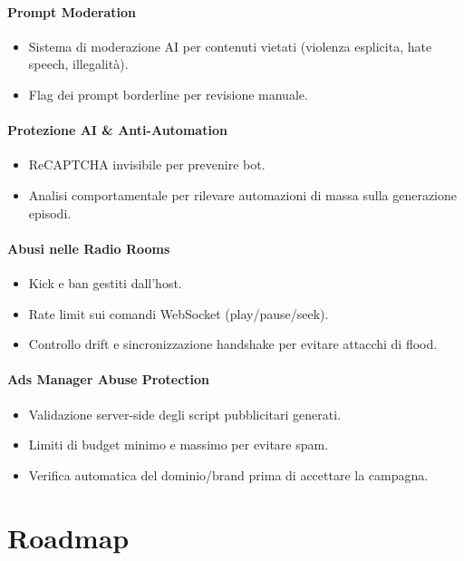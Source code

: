 \documentclass[11pt,a4paper]{article}
\begin{document}
\paragraph{Prompt Moderation}
\begin{itemize}
    \item Sistema di moderazione AI per contenuti vietati (violenza esplicita, hate speech, illegalità).
    \item Flag dei prompt borderline per revisione manuale.
\end{itemize}

\paragraph{Protezione AI \& Anti-Automation}
\begin{itemize}
    \item ReCAPTCHA invisibile per prevenire bot.
    \item Analisi comportamentale per rilevare automazioni di massa sulla generazione episodi.
\end{itemize}

\paragraph{Abusi nelle Radio Rooms}
\begin{itemize}
    \item Kick e ban gestiti dall’host.
    \item Rate limit sui comandi WebSocket (play/pause/seek).
    \item Controllo drift e sincronizzazione handshake per evitare attacchi di flood.
\end{itemize}

\paragraph{Ads Manager Abuse Protection}
\begin{itemize}
    \item Validazione server-side degli script pubblicitari generati.
    \item Limiti di budget minimo e massimo per evitare spam.
    \item Verifica automatica del dominio/brand prima di accettare la campagna.
\end{itemize}
\section{Roadmap}
\end{document}
